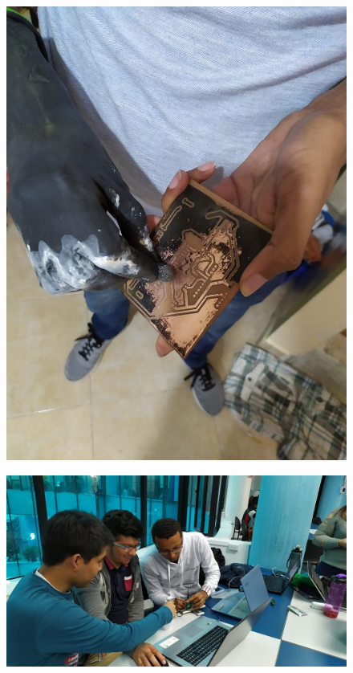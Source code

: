 \documentclass[10pt,a4paper]{article}
\begin{document}
\begin{multicols}{2}
\begin{figure}[H]
\includegraphics[scale=0.18]{limpiar}
\end{figure}
\begin{figure}[H]
\centering
\includegraphics[scale=0.15]{anexo1}
\end{figure}
\begin{figure}[H]

\end{figure}
\end{multicols}
\end{document}
